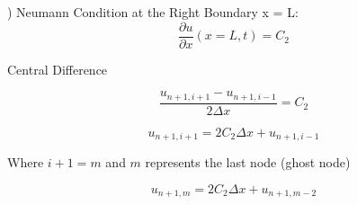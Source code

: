 \documentclass[10pt, letter, showtrims]{extarticle}
\newcommand{\boxedeq}[2]{\begin{empheq}[box={\fboxsep=6pt\fbox}]{align}\label{#1}#2\end{empheq}}
\begin{document}
		) Neumann Condition at the Right Boundary x = L: \\
		
		\begin{equation}
			\frac{\partial u}{\partial x}(x=L, t) = C_{2}
    		\end{equation}
%    		
%    		
%    		
%    		
%    		
%    		
%
%		
%    		
    		
    		\noindent
    		Central Difference
    		
    		\begin{equation}
    			\frac{u_{n+1,i+1} - u_{n+1,i-1}}{2 \Delta x} = C_{2}
    		\end{equation}
    		
    		\begin{equation}
    			u_{n+1,i+1} = 2 C_{2} \Delta x + u_{n+1,i-1}
    		\end{equation}
    		
    		\noindent
    		Where $i+1 = m$ and $m$ represents the last node (ghost node)
    		
    		\begin{equation}
    			u_{n+1,m} = 2 C_{2} \Delta x + u_{n+1,m-2}
    		\end{equation}
    		
\end{document}
